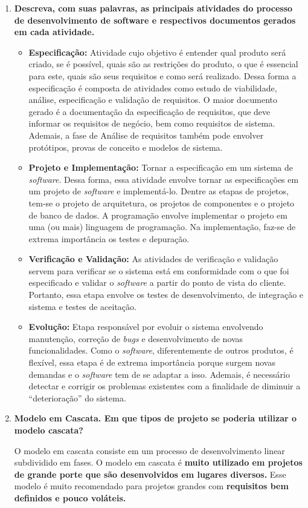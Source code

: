 \documentclass[12pt, a4paper]{article}
\newcommand{\tit}[1]{\textit{#1}}
\newcommand{\tb}[1]{\textbf{#1}}
\newcommand{\sw}{\tit{software}}
\newcommand{\ssw}{\tit{software} }
\newcommand{\question}[1]{\item \tb{#1}}
\newcommand{\answer}[1]{\par #1}
\newcommand{\quotes}[1]{``#1''}
\begin{document}
\begin{enumerate}[label=\textbf{\arabic*.}]
        \question{Descreva, com suas palavras, as principais atividades do processo de desenvolvimento de software e respectivos documentos gerados em cada atividade.}
        \answer{
            \begin{itemize}
                \item \tb{Especificação:} Atividade cujo objetivo é entender qual produto será criado, se é possível, quais são as restrições do produto, o que é essencial para este, quais são seus requisitos e como será realizado. Dessa forma a especificação é composta de atividades como estudo de viabilidade, análise, especificação e validação de requisitos. O maior documento gerado é a documentação da especificação de requisitos, que deve informar os requisitos de negócio, bem como requisitos de sistema. Ademais, a fase de Análise de requisitos também pode envolver protótipos, provas de conceito e modelos de sistema.
                \item \tb{Projeto e Implementação:} Tornar a especificação em um sistema de \sw. Dessa forma, essa atividade envolve tornar as especificações em um projeto de \ssw e implementá-lo. Dentre as etapas de projetos, tem-se o projeto de arquitetura, os projetos de componentes e o projeto de banco de dados. A programação envolve implementar o projeto em uma (ou mais) linguagem de programação. Na implementação, faz-se de extrema importância os testes e depuração.
                \item \tb{Verificação e Validação:} As atividades de verificação e validação servem para verificar se o sistema está em conformidade com o que foi especificado e validar o \ssw a partir do ponto de vista do cliente. Portanto, essa etapa envolve os testes de desenvolvimento, de integração e sistema e testes de aceitação. 
                \item \tb{Evolução:} Etapa responsável por evoluir o sistema envolvendo  manutenção, correção de \tit{bugs} e desenvolvimento de novas funcionalidades. Como o \sw, diferentemente de outros produtos, é flexível, essa etapa é de extrema importância porque surgem novas demandas e o \ssw tem de se adaptar a isso. Ademais, é necessário detectar e corrigir os problemas existentes com a finalidade de diminuir a \quotes{deterioração} do sistema.
            \end{itemize}
        }
        
        \question{Modelo em Cascata. Em que tipos de projeto se poderia utilizar o modelo cascata?}
        \answer{
        O modelo em cascata consiste em um processo de desenvolvimento linear subdividido em fases. O modelo em cascata é \tb{muito utilizado em projetos de grande porte que são desenvolvidos em lugares diversos.} Esse modelo é muito recomendado para projetos grandes com \tb{requisitos bem definidos e pouco voláteis.}
        }
        \\
        

\end{enumerate}
\end{document}

